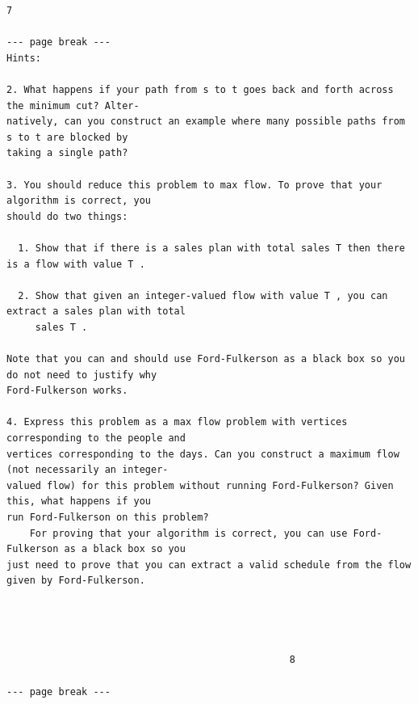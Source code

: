 \documentclass[12pt]{article}
\begin{document}
\begin{Verbatim}[breaklines=true,fontsize=\small]
                                                      7

--- page break ---
Hints:

2. What happens if your path from s to t goes back and forth across the minimum cut? Alter-
natively, can you construct an example where many possible paths from s to t are blocked by
taking a single path?

3. You should reduce this problem to max flow. To prove that your algorithm is correct, you
should do two things:

  1. Show that if there is a sales plan with total sales T then there is a flow with value T .

  2. Show that given an integer-valued flow with value T , you can extract a sales plan with total
     sales T .

Note that you can and should use Ford-Fulkerson as a black box so you do not need to justify why
Ford-Fulkerson works.

4. Express this problem as a max flow problem with vertices corresponding to the people and
vertices corresponding to the days. Can you construct a maximum flow (not necessarily an integer-
valued flow) for this problem without running Ford-Fulkerson? Given this, what happens if you
run Ford-Fulkerson on this problem?
    For proving that your algorithm is correct, you can use Ford-Fulkerson as a black box so you
just need to prove that you can extract a valid schedule from the flow given by Ford-Fulkerson.




                                                 8

--- page break ---
\end{Verbatim}
\end{document}
